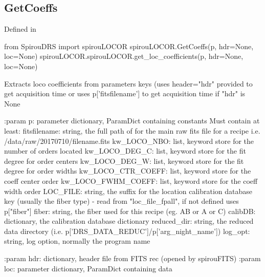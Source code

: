 \noindent\begin{minipage}{\textwidth}
\subsection{GetCoeffs}

Defined in \spirouLOCOR{}

\begin{pythonbox}
from SpirouDRS import spirouLOCOR
spirouLOCOR.GetCoeffs(p, hdr=None, loc=None)
spirouLOCOR.spirouLOCOR.get_loc_coefficients(p, hdr=None, loc=None)
\end{pythonbox}

\begin{pythondocstring}
Extracts loco coefficients from parameters keys (uses header="hdr" provided
to get acquisition time or uses p['fitsfilename'] to get acquisition time if
"hdr" is None

:param p: parameter dictionary, ParamDict containing constants
    Must contain at least:
            fitsfilename: string, the full path of for the main raw fits
                          file for a recipe
                          i.e. /data/raw/20170710/filename.fits
            kw_LOCO_NBO: list, keyword store for the number of orders
                         located
            kw_LOCO_DEG_C: list, keyword store for the fit degree for
                           order centers
            kw_LOCO_DEG_W: list, keyword store for the fit degree for
                           order widths
            kw_LOCO_CTR_COEFF: list, keyword store for the coeff center
                               order
            kw_LOCO_FWHM_COEFF: list, keyword store for the coeff width
                                order
            LOC_FILE: string, the suffix for the location calibration
                      database key (usually the fiber type)
                         - read from "loc_file_fpall", if not defined
                           uses p["fiber"]
            fiber: string, the fiber used for this recipe (eg. AB or A or C)
            calibDB: dictionary, the calibration database dictionary
            reduced_dir: string, the reduced data directory
                         (i.e. p['DRS_DATA_REDUC']/p['arg_night_name'])
            log_opt: string, log option, normally the program name

:param hdr: dictionary, header file from FITS rec (opened by spirouFITS)
:param loc: parameter dictionary, ParamDict containing data


\end{pythondocstring}
\end{minipage}
